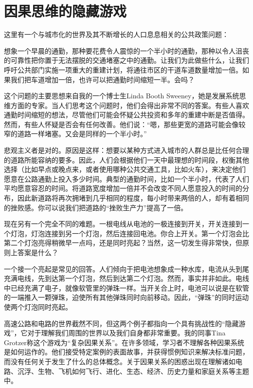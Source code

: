 \section*{因果思维的隐藏游戏}

这里有一个与城市化的世界及其不断增长的人口息息相关的公共政策问题：

想象一个早晨的通勤，那种要花费令人震惊的一个半小时的通勤，那种以令人沮丧的可靠性把你置于无法摆脱的交通堵塞之中的通勤。让我们为此做些什么，让我们呼吁公共部门实施一项重大的重建计划，将通往市区的干道车道数量增加一倍。如果我们把车道增加一倍，也许可以把通勤时间缩短一半。会吗？

这个问题的主要思想来自我的一个博士生Linda Booth Sweeney，她是发展系统思维方面的专家。当人们思考这个问题时，他们会得出非常不同的答案。有些人喜欢通勤时间缩短的想法，尽管他们可能会怀疑公共投资和多年的重建中断是否值得。然而，有些人怀疑是否会有任何改善。他们说：“嗯，那些更宽的道路可能会像较窄的道路一样堵塞。又会是同样的一个半小时。”

悲观主义者是对的。原因是这样：想要以某种方式进入城市的人群总是比任何合理的道路所能容纳的要多。因此，人们会根据他们一天中最理想的时间段，权衡其他选择（比如早点或晚点来，或者使用哪种公共交通工具，比如火车），来决定他们愿意在公路通勤上投入多少时间。典型的通勤时间，比如一个半小时，代表了人们平均愿意容忍的时间。将道路宽度增加一倍并不会改变不同人愿意投入的时间的分布，因此新道路将再次拥堵到几乎相同的程度，每小时带来两倍的人，却有着相同的挫败感。你可以说我们把道路的“挫败生产力”提高了一倍。

现在另有一个完全不同的难题。一根电线从电池的一极连接到开关，开关连接到一个灯泡，灯泡连接到另一个灯泡，然后连接回电池。你合上开关。第一个灯泡会比第二个灯泡亮得稍微早一点吗，还是同时亮起？当然，这一切发生得非常快，但原则上答案是什么？

一个接一个亮起是常见的回答。人们倾向于把电池想象成一种水库，电流从头到尾充满电线，先到达第一个灯泡，然后到达第二个灯泡。然而，事实并非如此。电线中已经充满了电子，就像软管里的弹珠一样。当开关合上时，电池可以说是在软管的一端推入一颗弹珠，迫使所有其他弹珠同时向前移动。因此，“弹珠”的同时运动使两个灯泡同时亮起。

高速公路和电路的世界截然不同，但这两个例子都指向一个具有挑战性的“隐藏游戏”，它对于理解我们周围的世界以及我们自身都非常重要。我的同事Tina Grotzer称这个游戏为“复杂因果关系”。在许多领域，学习者不理解各种因果系统是如何运作的。他们接受特定案例的表面故事，并获得惯例知识来解决标准问题，而没有任何关于发生了什么的总体概念。关于因果关系的困惑出现在理解诸如电路、沉浮、生物、飞机如何飞行、进化、生态、经济、历史力量和家庭关系等主题中。

